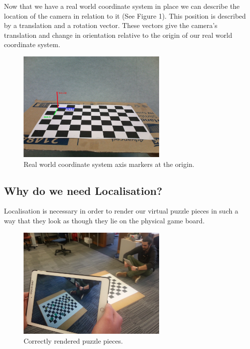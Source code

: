 \documentclass{article}
\begin{document}
Now that we have a real world coordinate system in place we can describe the location of the camera in relation to it (See Figure 1). This position is described by a translation and a rotation vector. These vectors give the camera's translation and change in orientation relative to the origin of our real world coordinate system.\par 


\begin{figure}[ht]
\begin{center}
\includegraphics[width=0.65\textwidth]{cam} 
\caption{Real world coordinate system axis markers at the origin.}
\end{center}
\end{figure}

\subsection {Why do we need Localisation?}

Localisation is necessary in order to render our virtual puzzle pieces in such a way that they look as though they lie on the physical game board. 
\vspace*{2\baselineskip}

\begin{figure}[H]
\begin{center}
\includegraphics[width=0.65\textwidth]{big_gig} 
\caption{Correctly rendered puzzle pieces.}
\end{center}
\end{figure}
\end{document}
